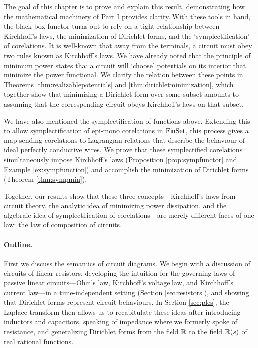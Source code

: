 The goal of this chapter is to prove and explain this result, demonstrating how
the mathematical machinery of Part I provides clarity. With these tools in hand,
the black box functor turns out to rely on a tight relationship between
Kirchhoff's laws, the minimization of Dirichlet forms, and the
`symplectification' of corelations. It is well-known that away from the
terminals, a circuit must obey two rules known as Kirchhoff's laws.  We have
already noted that the principle of minimum power states that a circuit will
`choose' potentials on its interior that minimize the power functional.  We
clarify the relation between these points in Theorems
\ref{thm:realizablepotentials} and \ref{thm:dirichletminimization}, which
together show that minimizing a Dirichlet form over some subset amounts to
assuming that the corresponding circuit obeys Kirchhoff's laws on that subset.

We have also mentioned the symplectification of functions above.  Extending this
to allow symplectification of epi-mono corelations in $\mathrm{FinSet}$, this process
gives a map sending corelations to Lagrangian relations that describe the
behaviour of ideal perfectly conductive wires.  We prove that these
symplectified corelations simultaneously impose Kirchhoff's laws (Proposition
\ref{prop:sympfunctor} and Example \ref{ex:sympfunction}) and accomplish the
minimization of Dirichlet forms (Theorem \ref{thm:sympmin}).  

Together, our results show that these three concepts---Kirchhoff's laws from
circuit theory, the analytic idea of minimizing power dissipation, and the
algebraic idea of symplectification of corelations---are merely different faces
of one law: the law of composition of circuits.

\paragraph{Outline.}
First we discuss the semantics of circuit diagrams. We begin with a discussion
of circuits of linear resistors, developing the intuition for the governing laws
of passive linear circuits---Ohm's law, Kirchhoff's voltage law, and Kirchhoff's
current law---in a time-independent setting (Section \ref{sec:resistors}), and
showing that Dirichlet forms represent circuit behaviours.  In Section
\ref{sec:plcs}, the Laplace transform then allows us to recapitulate these ideas
after introducing inductors and capacitors, speaking of impedance where we
formerly spoke of resistance, and generalizing Dirichlet forms from the field
${\mathbb{R}}$ to the field ${\mathbb{R}}(s)$ of real rational functions. 

